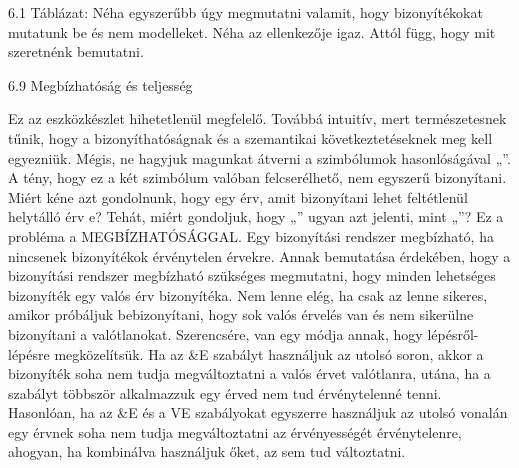 6.1 Táblázat: Néha egyszerűbb úgy megmutatni valamit, hogy bizonyítékokat mutatunk be és nem modelleket. Néha az ellenkezője igaz. Attól függ, hogy mit szeretnénk bemutatni.

6.9 Megbízhatóság és teljesség

Ez az eszközkészlet hihetetlenül megfelelő. Továbbá intuitív, mert természetesnek tűnik, hogy a bizonyíthatóságnak és a szemantikai következtetéseknek meg kell egyezniük. Mégis, ne hagyjuk magunkat átverni a szimbólumok hasonlóságával „”. A tény, hogy ez a két szimbólum valóban felcserélhető, nem egyszerű bizonyítani.
Miért kéne azt gondolnunk, hogy egy érv, amit bizonyítani lehet feltétlenül helytálló érv e? Tehát, miért gondoljuk, hogy „” ugyan azt jelenti, mint „”?
Ez a probléma a MEGBÍZHATÓSÁGGAL. Egy bizonyítási rendszer megbízható, ha nincsenek bizonyítékok érvénytelen érvekre. Annak bemutatása érdekében, hogy a bizonyítási rendszer megbízható szükséges megmutatni, hogy minden lehetséges bizonyíték egy valós érv bizonyítéka. 
Nem lenne elég, ha csak az lenne sikeres, amikor próbáljuk bebizonyítani, hogy sok valós érvelés van és nem sikerülne bizonyítani a valótlanokat.
Szerencsére, van egy módja annak, hogy lépésről-lépésre megközelítsük. Ha az &E szabályt használjuk az utolsó soron, akkor a bizonyíték soha nem tudja megváltoztatni a valós érvet valótlanra, utána, ha a szabályt többször alkalmazzuk egy érved nem tud érvénytelenné tenni. Hasonlóan, ha az &E és a VE szabályokat egyszerre használjuk az utolsó vonalán egy érvnek soha nem tudja megváltoztatni az érvényességét érvénytelenre, ahogyan, ha kombinálva használjuk őket, az sem tud változtatni.

